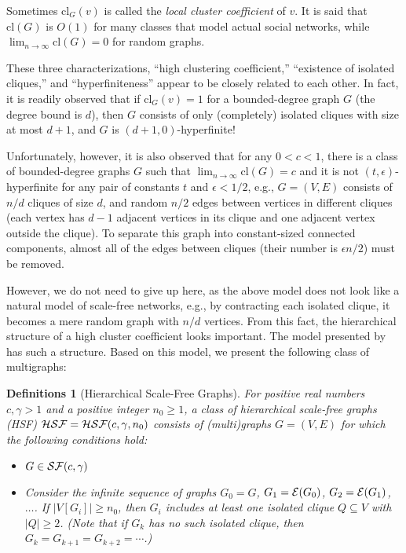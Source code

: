 \documentclass[11pt]{article}
\newtheorem{df}[thm]{Definitions}
\begin{document}
Sometimes $\mbox{cl}_G(v)$ is called the {\em local cluster coefficient} of $v$. 
It is said that $\mbox{cl}(G)$ is $O(1)$ for 
many classes that model actual social networks, while 
$\lim_{n \to \infty} \mbox{cl}(G) = 0$ for random graphs. 

These three characterizations, 
``high clustering coefficient,'' 
``existence of isolated cliques,'' 
and 
``hyperfiniteness''  
appear to be closely related to each other.  
In fact, it is readily observed that 
if $\mbox{cl}_G(v) = 1$ for a bounded-degree graph $G$ (the degree bound is $d$), 
then $G$ consists of only (completely) isolated cliques with size at most $d+1$, and 
$G$ is $(d+1, 0)$-hyperfinite! 

Unfortunately, however, 
it is also observed that 
for any $0 < c < 1$, 
there is a class of bounded-degree graphs $G$ 
such that $\lim_{n \to \infty} \mbox{cl}(G) = c$ and 
it is not $(t, \epsilon)$-hyperfinite 
for any pair of constants $t$ and $\epsilon < 1/2$, e.g., 
$G =(V,E)$ 
consists of 
$n/d$ cliques of size $d$, 
and random $n/2$ edges between 
vertices in different cliques (each vertex has $d-1$ adjacent vertices in its clique and one adjacent vertex outside the clique).  
To separate this graph into constant-sized connected components, almost all of the edges between cliques (their number is $\epsilon n/2$) must be removed. 

However, we do not need to give up here, as the above model does not look like a natural model of 
scale-free networks, e.g., by contracting each isolated clique, it becomes a mere random graph with $n/d$ vertices.  
From this fact, the hierarchical structure of a high cluster coefficient looks important. 
The model presented by \cite{Uno-Watanabe_ScaleFree} has such a structure.  
Based on this model, we present the following class of multigraphs: 







\begin{df}[Hierarchical Scale-Free Graphs]\label{df:HSF}
For positive real numbers $c, \gamma > 1$ and a positive integer $n_0 \geq 1$, 
a class of {\em hierarchical scale-free graphs (HSF)} ${\cal HSF} = {\cal HSF}(c,\gamma, n_0)$
consists of (multi)graphs $G=(V,E)$ 
for which the following conditions hold: 
\begin{itemize}
\item[(i)] $G \in {\cal SF}(c,\gamma)$
\item[(ii)] Consider the infinite sequence of graphs 
$G_0 =G$, $G_1 = {\cal E}(G_{0})$, $G_2 = {\cal E}(G_{1})$, $\ldots$.   
If $|V[G_i]| \geq n_0$, then $G_i$ includes at least one isolated clique 
$Q \subseteq V$ with $|Q| \geq 2$. 
(Note that if $G_k$ has no such isolated clique, then $G_k = G_{k+1} = G_{k+2} =\cdots$.)
\end{itemize}
\end{df}
\end{document}
